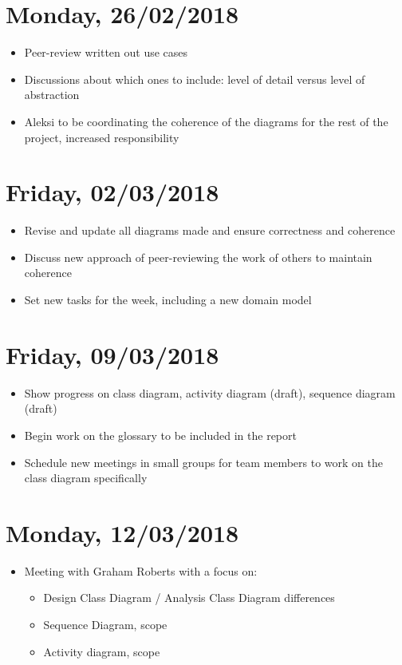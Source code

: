 \section{Monday, 26/02/2018}
\begin{itemize}
    \item Peer-review written out use cases
    \item Discussions about which ones to include: level of detail versus level of abstraction
    \item Aleksi to be coordinating the coherence of the diagrams for the rest of the project, increased responsibility
\end{itemize}

\section{Friday, 02/03/2018}
\begin{itemize}
    \item Revise and update all diagrams made and ensure correctness and coherence
    \item Discuss new approach of peer-reviewing the work of others to maintain coherence
    \item Set new tasks for the week, including a new domain model
\end{itemize}

\section{Friday, 09/03/2018}
\begin{itemize}
    \item Show progress on class diagram, activity diagram (draft), sequence diagram (draft)
    \item Begin work on the glossary to be included in the report
    \item Schedule new meetings in small groups for team members to work on the class diagram specifically
\end{itemize}

\section{Monday, 12/03/2018}
\begin{itemize}
    \item Meeting with Graham Roberts with a focus on:
    \begin{itemize}
        \item Design Class Diagram / Analysis Class Diagram differences
        \item Sequence Diagram, scope
        \item Activity diagram, scope
    \end{itemize}
\end{itemize}


